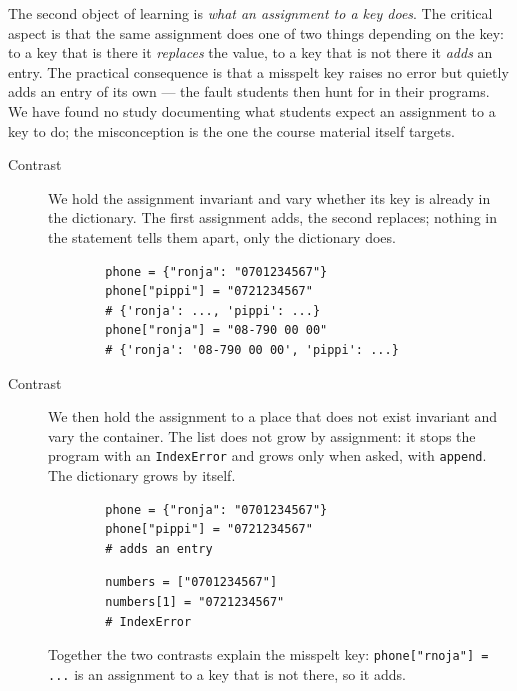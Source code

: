 The second object of learning is \emph{what an assignment to a key does}. The
critical aspect is that the same assignment does one of two things depending on
the key: to a key that is there it \emph{replaces} the value, to a key that is
not there it \emph{adds} an entry. The practical consequence is that a misspelt
key raises no error but quietly adds an entry of its own --- the fault
students then hunt for in their programs.
We have found no study documenting what students expect an assignment to a key
to do; the misconception is the one the course material itself targets.

\begin{description}
  \item[Contrast] We hold the assignment invariant and vary whether its key is
    already in the dictionary. The first assignment adds, the second replaces;
    nothing in the statement tells them apart, only the dictionary does.

    \hfill
    \begin{minipage}[t]{0.55\columnwidth}
      \begin{verbatim}
        phone = {"ronja": "0701234567"}
        phone["pippi"] = "0721234567"
        # {'ronja': ..., 'pippi': ...}
        phone["ronja"] = "08-790 00 00"
        # {'ronja': '08-790 00 00', 'pippi': ...}
      \end{verbatim}
    \end{minipage}
    \hfill\null

  \item[Contrast] We then hold the assignment to a place that does not exist
    invariant and vary the container. The list does not grow by assignment:
    it stops the program with an \texttt{IndexError} and grows
    only when asked, with \texttt{append}. The dictionary grows by
    itself.

    \hfill
    \begin{minipage}[t]{0.45\columnwidth}
      \begin{verbatim}
        phone = {"ronja": "0701234567"}
        phone["pippi"] = "0721234567"
        # adds an entry
      \end{verbatim}
    \end{minipage}
    \hfill
    \begin{minipage}[t]{0.45\columnwidth}
      \begin{verbatim}
        numbers = ["0701234567"]
        numbers[1] = "0721234567"
        # IndexError
      \end{verbatim}
    \end{minipage}
    \newline
    Together the two contrasts explain the misspelt key:
    \texttt{phone["rnoja"] = ...} is an assignment to a key that is
    not there, so it adds.
\end{description}

